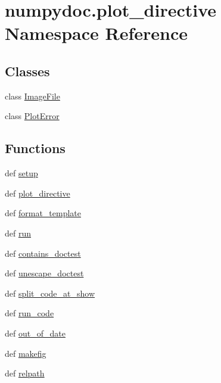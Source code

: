 \hypertarget{namespacenumpydoc_1_1plot__directive}{}\section{numpydoc.\+plot\+\_\+directive Namespace Reference}
\label{namespacenumpydoc_1_1plot__directive}
\subsection*{Classes}
\begin{DoxyCompactItemize}
\item 
class \hyperlink{classnumpydoc_1_1plot__directive_1_1ImageFile}{Image\+File}
\item 
class \hyperlink{classnumpydoc_1_1plot__directive_1_1PlotError}{Plot\+Error}
\end{DoxyCompactItemize}
\subsection*{Functions}
\begin{DoxyCompactItemize}
\item 
def \hyperlink{namespacenumpydoc_1_1plot__directive_af9052de7268ee46d32141b97fa2deadb}{setup}
\item 
def \hyperlink{namespacenumpydoc_1_1plot__directive_a30d185f741af75c4d35e2baf8f9d0521}{plot\+\_\+directive}
\item 
def \hyperlink{namespacenumpydoc_1_1plot__directive_af3fc62cfa211787c3b2d646522f6f009}{format\+\_\+template}
\item 
def \hyperlink{namespacenumpydoc_1_1plot__directive_ac7c40115743e00af34fc5377393976d1}{run}
\item 
def \hyperlink{namespacenumpydoc_1_1plot__directive_a04215e4efbb5d5a6970dc3dbfda07a95}{contains\+\_\+doctest}
\item 
def \hyperlink{namespacenumpydoc_1_1plot__directive_ad90fc28901ef394e8c3fb4adcdfef383}{unescape\+\_\+doctest}
\item 
def \hyperlink{namespacenumpydoc_1_1plot__directive_a9947c9a52b8b0c0a978cbcd49be5b63d}{split\+\_\+code\+\_\+at\+\_\+show}
\item 
def \hyperlink{namespacenumpydoc_1_1plot__directive_a464916086122f85caf263d1206e10f4c}{run\+\_\+code}
\item 
def \hyperlink{namespacenumpydoc_1_1plot__directive_a4ace626a42dd67c151e73172d34cf547}{out\+\_\+of\+\_\+date}
\item 
def \hyperlink{namespacenumpydoc_1_1plot__directive_acf7dbd824eccc8aa2e13ea956fc62c7a}{makefig}
\item 
def \hyperlink{namespacenumpydoc_1_1plot__directive_a37364d97bfc8ac16b84c3e947a819073}{relpath}
\end{DoxyCompactItemize}
